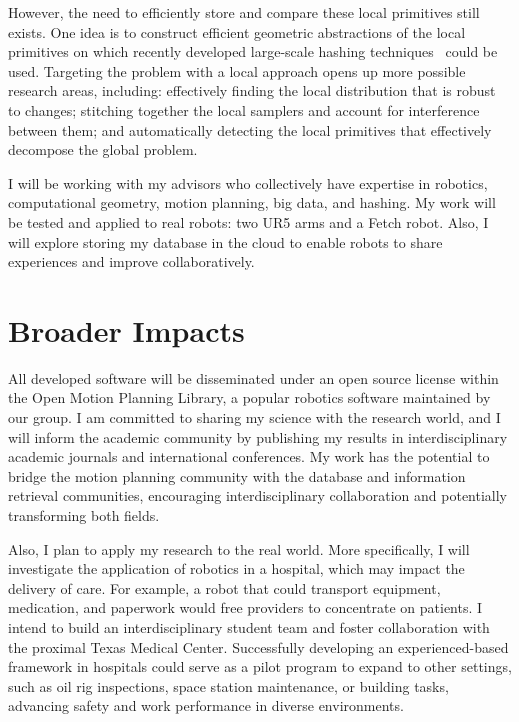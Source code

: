\documentclass[12pt]{article}
\begin{document}
\cite{chamzas2019using-local-experiences-for-global-motion-planning}
\cite{chamzas2022-motionbenchmaker}

\cite{chamzas2022-reconstruction}

However, the need to efficiently store and compare these local primitives still exists. One idea is to construct efficient geometric abstractions of the local primitives on which recently developed large-scale hashing techniques~\cite{Anshu2014} could be used.  Targeting the problem with a local approach opens up more possible research areas, including: effectively finding the local distribution that is robust to changes; stitching together the local samplers and account for interference between them; and automatically detecting the local primitives that effectively decompose the global problem.

I will be working with my advisors who collectively have expertise in robotics, computational geometry, motion planning, big data, and hashing. My work will be tested and applied to real robots: two UR5 arms and a Fetch robot. Also, I will explore storing my database in the cloud to enable robots to share experiences and improve collaboratively.

\section{Broader Impacts}
All developed software will be disseminated under an open source license within the Open Motion Planning Library, a popular robotics software maintained by our group. I am committed to sharing my science with the research world, and I will inform the academic community by publishing my results in interdisciplinary academic journals and international conferences. My work has the potential to bridge the motion planning community with the database and information retrieval communities, encouraging interdisciplinary collaboration and potentially transforming both fields. 

Also, I plan to apply my research to the real world. More specifically, I will investigate the application of robotics in a hospital, which may impact the delivery of care. For example, a robot that could transport equipment, medication, and paperwork would free providers to concentrate on patients. I intend to build an interdisciplinary student team and foster collaboration with the proximal Texas Medical Center. Successfully developing an experienced-based framework in hospitals could serve as a pilot program to expand to other settings, such as oil rig inspections, space station maintenance, or building tasks, advancing safety and work performance in diverse environments.

\vspace{1em}
\footnotesize

\end{document}
